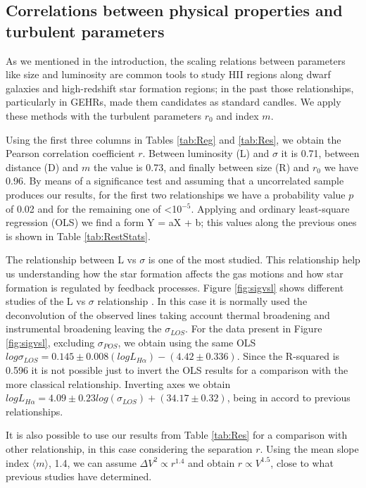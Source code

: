 \documentclass[fleqn,usenatbib, useAMS, a4paper]{mnras}
\begin{document}
\subsection{Correlations between physical properties and turbulent parameters}

As we mentioned in the introduction, the scaling relations between parameters like size and luminosity are common tools to study HII regions along dwarf galaxies and high-redshift star formation regions; in the past those relationships, particularly in GEHRs, made them candidates as standard candles. 
We apply these methods with the turbulent parameters \(r_0\) and index \(m\).

Using the first three columns in Tables \ref{tab:Reg} and \ref{tab:Res}, we obtain the Pearson correlation coefficient $r$. Between luminosity (L) and \(\sigma\) it is 0.71, between distance (D) and \(m\) the value is 0.73, and finally between size (R) and \(r_0\) we have 0.96. 
By means of a significance test and assuming that a uncorrelated sample produces our results, for the first two relationships we have a probability value $p$ of 0.02 and for the remaining one of <10\(^{-5}\).
Applying and ordinary least-square regression (OLS) we find a form Y = aX + b; this values along the previous ones is shown in Table \ref{tab:RestStats}.

The relationship between L vs \(\sigma\) is one of the most studied. 
This relationship help us understanding how the star formation affects the gas motions and how star formation is regulated by feedback processes. 
Figure \ref{fig:sigvsl} shows different studies of the L vs \(\sigma\) relationship \citep{1988A&A...201..199A,Rozas:2006b,2015MNRAS.449.3568M}. 
In this case it is normally used the deconvolution of the observed lines taking account thermal broadening and instrumental broadening leaving the \(\sigma_{LOS}\). 
For the data present in Figure \ref{fig:sigvsl}, excluding \(\sigma_{POS}\), we obtain using the same OLS \(log \sigma_{LOS} = 0.145 \pm 0.008 (logL_{H\alpha}) - (4.42 \pm 0.336) \).
Since the R-squared is 0.596 it is not possible just to invert the OLS results for a comparison with the more classical relationship. Inverting axes we obtain \(log L_{H\alpha} = 4.09 \pm 0.23 log (\sigma_{LOS}) + (34.17 \pm 0.32) \), being in accord to previous relationships. 

It is also possible to use our results from Table \ref{tab:Res} for a comparison with other relationship, in this case considering the separation \(r\).
Using the mean slope index \(\langle m \rangle \), 1.4, we can assume \(\Delta V^{2} \propto r^{1.4} \) and obtain \(r \propto V^{1.5} \), close to what previous studies have determined. 
\end{document}
